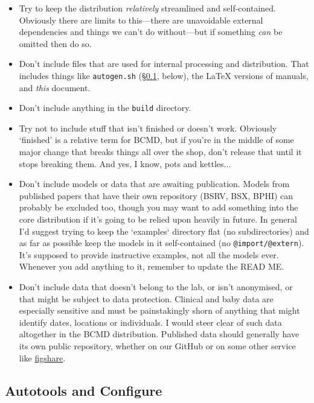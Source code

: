 \documentclass[a4paper,11pt]{article}
\begin{document}
\begin{itemize}
\item Try to keep the distribution \textit{relatively} streamlined and self-contained. Obviously there are limits to this---there are unavoidable external dependencies and things we can't do without---but if something \textit{can} be omitted then do so.
\item Don't include files that are used for internal processing and distribution. That includes things like \texttt{autogen.sh} (\S\ref{autogen}, below), the \LaTeX{} versions of manuals, and \textit{this} document.
\item Don't include anything in the \texttt{build} directory.
\item Try not to include stuff that isn't finished or doesn't work. Obviously `finished' is a relative term for BCMD, but if you're in the middle of some major change that breaks things all over the shop, don't release that until it stops breaking them. And yes, I know, pots and kettles...
\item Don't include models or data that are awaiting publication. Models from published papers that have their own repository (BSRV, BSX, BPHI) can probably be excluded too, though you may want to add something into the core distribution if it's going to be relied upon heavily in future. In general I'd suggest trying to keep the `examples` directory flat (no subdirectories) and as far as possible keep the models in it self-contained (no \texttt{@import/\texttt{@extern}}). It's supposed to provide instructive examples, not all the models ever. Whenever you add anything to it, remember to update the READ ME.
\item Don't include data that doesn't belong to the lab, or isn't anonymised, or that might be subject to data protection. Clinical and baby data are especially sensitive and must be painstakingly shorn of anything that might identify dates, locations or individuals. I would steer clear of such data altogether in the BCMD distribution. Published data should generally have its own public repository, whether on our GitHub or on some other service like \href{https://figshare.com}{figshare}.
\end{itemize} 

\subsection{Autotools and Configure}\label{autogen}
\end{document}
